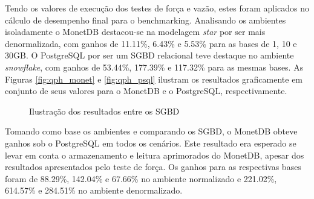 \documentclass[12pt]{article}
\begin{document}
Tendo os valores de execução dos testes de força e vazão, estes foram aplicados 
no cálculo de desempenho final para o benchmarking. Analisando os ambientes isoladamente 
o MonetDB destacou-se na modelagem \textit{star} por ser mais denormalizada, com 
ganhos de 11.11\%, 6.43\% e 5.53\% para as bases de 1, 10 e 30GB.  
O PostgreSQL por ser um SGBD relacional teve destaque no ambiente \textit{snowflake}, 
com ganhos de 53.44\%, 177.39\% e 117.32\% para as mesmas bases. 
As Figuras \ref{fig:qph_monet} e \ref{fig:qph_psql} ilustram os resultados graficamente 
em conjunto de seus valores para o MonetDB e o PostgreSQL, respectivamente. 

\begin{figure}[htpb]
    \centering
    \caption{Ilustração dos resultados entre os SGBD}\label{fig:qph_sgbd}
\end{figure}

Tomando como base os ambientes e comparando os SGBD, o MonetDB obteve ganhos sob o PostgreSQL 
em todos os cenários. Este resultado era esperado se levar em conta o armazenamento 
e leitura aprimorados do MonetDB, apesar dos resultados apresentados pelo teste de força. 
Os ganhos para as respectivas bases foram de 88.29\%, 142.04\% e 67.66\% no ambiente 
normalizado e 221.02\%, 614.57\% e 284.51\% no ambiente denormalizado.
\end{document}
